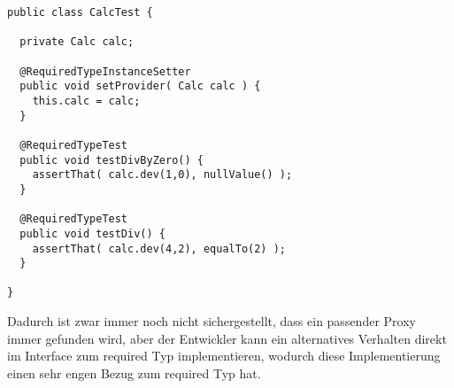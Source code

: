 \begin{lstlisting}[style = java, caption = Test CalcTest, captionpos = b, label = lst_testklasse_calc]
public class CalcTest {

  private Calc calc;
  
  @RequiredTypeInstanceSetter
  public void setProvider( Calc calc ) {
    this.calc = calc;
  }

  @RequiredTypeTest
  public void testDivByZero() {
    assertThat( calc.dev(1,0), nullValue() );
  }
  
  @RequiredTypeTest
  public void testDiv() {
    assertThat( calc.dev(4,2), equalTo(2) );
  }

}
\end{lstlisting}
\noindent
Dadurch ist zwar immer noch nicht sichergestellt, dass ein passender Proxy immer gefunden wird, aber der Entwickler kann ein alternatives Verhalten direkt im Interface zum required Typ implementieren, wodurch diese Implementierung einen sehr engen Bezug zum required Typ hat.